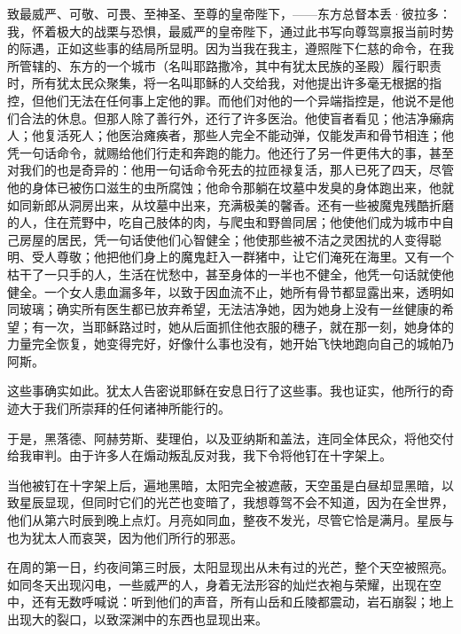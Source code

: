 致最威严、可敬、可畏、至神圣、至尊的皇帝陛下，——东方总督本丢·彼拉多：我，怀着极大的战栗与恐惧，最威严的皇帝陛下，通过此书写向尊驾禀报当前时势的际遇，正如这些事的结局所显明。因为当我在我主，遵照陛下仁慈的命令，在我所管辖的、东方的一个城市（名叫耶路撒冷，其中有犹太民族的圣殿）履行职责时，所有犹太民众聚集，将一名叫耶稣的人交给我，对他提出许多毫无根据的指控，但他们无法在任何事上定他的罪。而他们对他的一个异端指控是，他说不是他们合法的休息。但那人除了善行外，还行了许多医治。他使盲者看见；他洁净癞病人；他复活死人；他医治瘫痪者，那些人完全不能动弹，仅能发声和骨节相连；他凭一句话命令，就赐给他们行走和奔跑的能力。他还行了另一件更伟大的事，甚至对我们的也是奇异的：他用一句话命令死去的拉匝禄复活，那人已死了四天，尽管他的身体已被伤口滋生的虫所腐蚀；他命令那躺在坟墓中发臭的身体跑出来，他就如同新郎从洞房出来，从坟墓中出来，充满极美的馨香。还有一些被魔鬼残酷折磨的人，住在荒野中，吃自己肢体的肉，与爬虫和野兽同居；他使他们成为城市中自己房屋的居民，凭一句话使他们心智健全；他使那些被不洁之灵困扰的人变得聪明、受人尊敬；他把他们身上的魔鬼赶入一群猪中，让它们淹死在海里。又有一个枯干了一只手的人，生活在忧愁中，甚至身体的一半也不健全，他凭一句话就使他健全。一个女人患血漏多年，以致于因血流不止，她所有骨节都显露出来，透明如同玻璃；确实所有医生都已放弃希望，无法洁净她，因为她身上没有一丝健康的希望；有一次，当耶稣路过时，她从后面抓住他衣服的穗子，就在那一刻，她身体的力量完全恢复，她变得完好，好像什么事也没有，她开始飞快地跑向自己的城帕乃阿斯。\par

这些事确实如此。犹太人告密说耶稣在安息日行了这些事。我也证实，他所行的奇迹大于我们所崇拜的任何诸神所能行的。\par

于是，黑落德、阿赫劳斯、斐理伯，以及亚纳斯和盖法，连同全体民众，将他交付给我审判。由于许多人在煽动叛乱反对我，我下令将他钉在十字架上。\par

当他被钉在十字架上后，遍地黑暗，太阳完全被遮蔽，天空虽是白昼却显黑暗，以致星辰显现，但同时它们的光芒也变暗了，我想尊驾不会不知道，因为在全世界，他们从第六时辰到晚上点灯。月亮如同血，整夜不发光，尽管它恰是满月。星辰与也为犹太人而哀哭，因为他们所行的邪恶。\par

在周的第一日，约夜间第三时辰，太阳显现出从未有过的光芒，整个天空被照亮。如同冬天出现闪电，一些威严的人，身着无法形容的灿烂衣袍与荣耀，出现在空中，还有无数呼喊说：听到他们的声音，所有山岳和丘陵都震动，岩石崩裂；地上出现大的裂口，以致深渊中的东西也显现出来。\par

